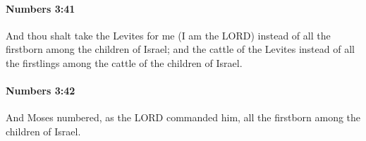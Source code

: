 		\paragraph{Numbers 3:41} %
			\label{NUMBERS-3-41}

			And thou shalt take the Levites for me (I am the LORD) instead of all the firstborn among the children of Israel; and the cattle of the Levites instead of all the firstlings among the cattle of the children of Israel.


		\paragraph{Numbers 3:42} %
			\label{NUMBERS-3-42}

			And Moses numbered, as the LORD commanded him, all the firstborn among the children of Israel.


